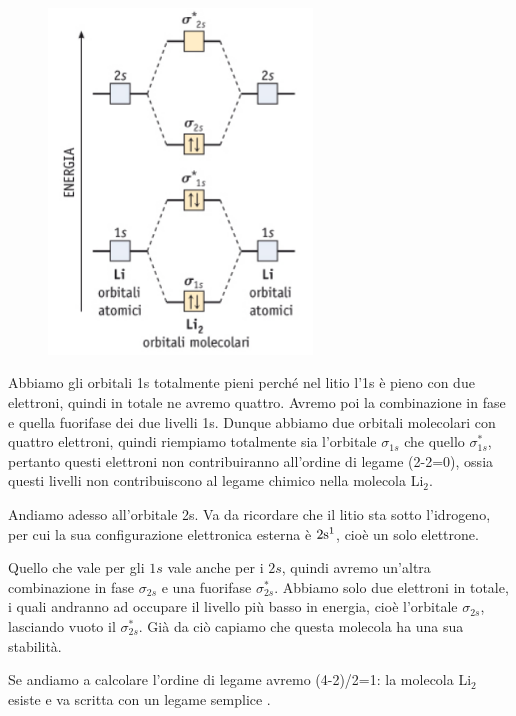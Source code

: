 \begin{minipage}{0.5\textwidth}
    \begin{figure}[H]
    \includegraphics[width=7cm]{immagini/orbitali_molecolari_Li_2.png}
    \end{figure}
    \end{minipage} \hfill
    \begin{minipage}{0.5\textwidth}
        \vspace{0.5cm}Abbiamo gli orbitali 1s totalmente pieni perché nel litio l'1s è pieno con due elettroni, quindi in totale ne avremo quattro. Avremo poi la combinazione in fase e quella fuorifase dei due livelli 1s. Dunque abbiamo due orbitali molecolari con quattro elettroni, quindi riempiamo totalmente sia l'orbitale $\sigma_{1s}$ che quello $\sigma^*_{1s}$, pertanto questi elettroni non contribuiranno all'ordine di legame (2-2=0), ossia questi livelli non contribuiscono al legame chimico nella molecola Li$_2$.

        \vspace{0.2cm}Andiamo adesso all'orbitale 2s. Va da ricordare che il litio sta sotto l'idrogeno, per cui la sua configurazione elettronica esterna è $\rm 2s^1$, cioè un solo elettrone.
        
        Quello che vale per gli $1s$ vale anche per i $2s$, quindi avremo un'altra combinazione in fase $\sigma_{2s}$ e una fuorifase $\sigma_{2s}^*$. Abbiamo solo due elettroni in totale, i quali andranno ad occupare il livello più basso in energia, cioè l'orbitale $\sigma_{2s}$, lasciando vuoto il $\sigma_{2s}^*$. Già da ciò capiamo che questa molecola ha una sua stabilità.
        
        Se andiamo a calcolare l'ordine di legame avremo (4-2)/2=1: la molecola Li$_2$ esiste e va scritta con un legame semplice .
    \end{minipage}


